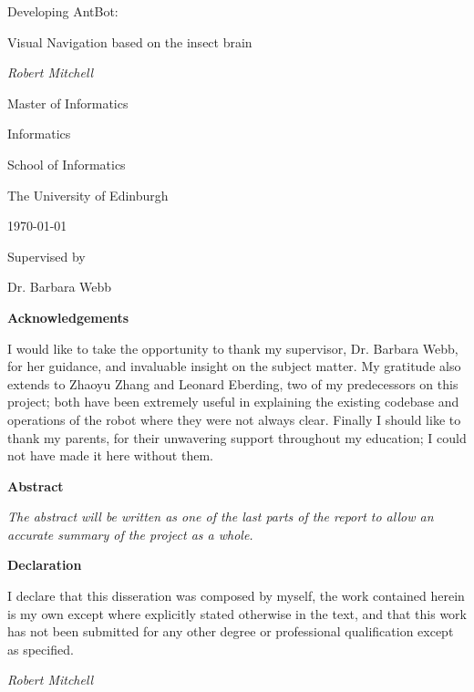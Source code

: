 \documentclass[a4paper,12pt]{article}
\begin{document}
\centering
\vspace*{5cm}
{\huge Developing AntBot: \par Visual Navigation based on the insect brain \par}
\vspace{1cm}
{\itshape Robert Mitchell}

\vspace{2cm}

{\large Master of Informatics \par}
{\large Informatics \par}
{\large School of Informatics \par}
{\large The University of Edinburgh \par}
\large \today \par

\vfill
Supervised by\par
Dr. Barbara Webb

\newpage

\centering
{\LARGE \textbf{Acknowledgements}}
\begin{flushleft}
 {\small
  I would like to take the opportunity to thank my supervisor, Dr. Barbara Webb, for her
  guidance, and invaluable insight on the subject matter. My gratitude also extends to
  Zhaoyu Zhang and Leonard Eberding, two of my predecessors on this project; both have been
  extremely useful in explaining the existing codebase and operations of the robot where they
  were not always clear. Finally I should like to thank my parents, for their unwavering support
  throughout my education; I could not have made it here without them. }
\end{flushleft}  

\newpage
\centering
{\LARGE\textbf{Abstract}}
\begin{flushleft}
  {\small \textit{The abstract will be written as one of the last parts of the report to allow
    an accurate summary of the project as a whole.}}
\end{flushleft}

\newpage

\centering
{\LARGE\textbf{Declaration}}
\begin{flushleft}
  {\small
    I declare that this disseration was composed by myself, the work
    contained herein is my own except where explicitly stated otherwise
    in the text, and that this work has not been submitted for any other
    degree or professional qualification except as specified.
    \par 

    \textit{Robert Mitchell}}

\end{flushleft}
\end{document}
